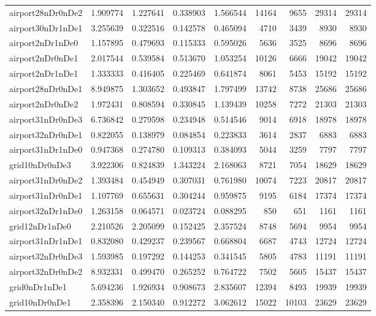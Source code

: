 \begin{longtable}{|l|r|r|r|r|r|r|r|r|}
airport28nDr0nDe2 & 1.909774 & 1.227641 & 0.338903 & 1.566544 & 14164 & 9655 & 29314 & 29314 \\
airport30nDr1nDe1 & 3.255639 & 0.322516 & 0.142578 & 0.465094 & 4710 & 3439 & 8930 & 8930 \\
airport2nDr1nDe0 & 1.157895 & 0.479693 & 0.115333 & 0.595026 & 5636 & 3525 & 8696 & 8696 \\
airport2nDr0nDe1 & 2.017544 & 0.539584 & 0.513670 & 1.053254 & 10126 & 6666 & 19042 & 19042 \\
airport2nDr1nDe1 & 1.333333 & 0.416405 & 0.225469 & 0.641874 & 8061 & 5453 & 15192 & 15192 \\
airport28nDr0nDe1 & 8.949875 & 1.303652 & 0.493847 & 1.797499 & 13742 & 8738 & 25686 & 25686 \\
airport2nDr0nDe2 & 1.972431 & 0.808594 & 0.330845 & 1.139439 & 10258 & 7272 & 21303 & 21303 \\
airport31nDr0nDe3 & 6.736842 & 0.279598 & 0.234948 & 0.514546 & 9014 & 6918 & 18978 & 18978 \\
airport32nDr0nDe1 & 0.822055 & 0.138979 & 0.084854 & 0.223833 & 3614 & 2837 & 6883 & 6883 \\
airport31nDr1nDe0 & 0.947368 & 0.274780 & 0.109313 & 0.384093 & 5044 & 3259 & 7797 & 7797 \\
grid10nDr0nDe3 & 3.922306 & 0.824839 & 1.343224 & 2.168063 & 8721 & 7054 & 18629 & 18629 \\
airport31nDr0nDe2 & 1.393484 & 0.454949 & 0.307031 & 0.761980 & 10074 & 7223 & 20817 & 20817 \\
airport31nDr0nDe1 & 1.107769 & 0.655631 & 0.304244 & 0.959875 & 9195 & 6184 & 17374 & 17374 \\
airport32nDr1nDe0 & 1.263158 & 0.064571 & 0.023724 & 0.088295 & 850 & 651 & 1161 & 1161 \\
grid12nDr1nDe0 & 2.210526 & 2.205099 & 0.152425 & 2.357524 & 8748 & 5694 & 9954 & 9954 \\
airport31nDr1nDe1 & 0.832080 & 0.429237 & 0.239567 & 0.668804 & 6687 & 4743 & 12724 & 12724 \\
airport32nDr0nDe3 & 1.593985 & 0.197292 & 0.144253 & 0.341545 & 5805 & 4783 & 11191 & 11191 \\
airport32nDr0nDe2 & 8.932331 & 0.499470 & 0.265252 & 0.764722 & 7502 & 5605 & 15437 & 15437 \\
grid0nDr1nDe1 & 5.694236 & 1.926934 & 0.908673 & 2.835607 & 12394 & 8493 & 19939 & 19939 \\
grid10nDr0nDe1 & 2.358396 & 2.150340 & 0.912272 & 3.062612 & 15022 & 10103 & 23629 & 23629 \\

\end{longtable}
